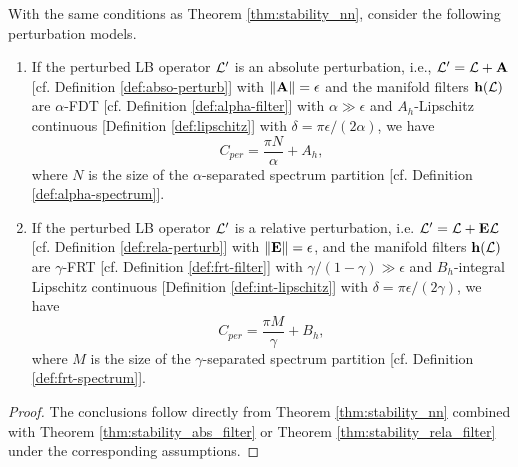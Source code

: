 \begin{proposition}
\label{prop:stability-nn}
With the same conditions as Theorem \ref{thm:stability_nn}, consider the following perturbation models.
\begin{enumerate}
    \item  If the perturbed LB operator ${\mathcal L}'$ is an absolute perturbation, i.e., ${\mathcal L}'={\mathcal L}+{\mathbf A}$ [cf. Definition \ref{def:abso-perturb}] with $\|{\mathbf A}\|=\epsilon$ and the manifold filters ${\mathbf h}({\mathcal L})$ are $\alpha$-FDT [cf. Definition \ref{def:alpha-filter}] with $\alpha\gg\epsilon$ and $A_h$-Lipschitz continuous [Definition \ref{def:lipschitz}] with $\delta = \pi\epsilon/(2\alpha)$, we have
    \begin{equation}
        C_{per} = \frac{\pi N}{\alpha} + A_h,
    \end{equation}
    where $N$ is the size of the $\alpha$-separated spectrum partition [cf. Definition \ref{def:alpha-spectrum}].
    \item If the perturbed LB operator ${\mathcal L}'$ is a relative perturbation, i.e. ${\mathcal L}'={\mathcal L}+{\mathbf E}{\mathcal L}$ [cf. Definition \ref{def:rela-perturb}] with $\|{\mathbf E}\|=\epsilon$, and the manifold filters ${\mathbf h}({\mathcal L})$ are $\gamma$-FRT [cf. Definition \ref{def:frt-filter}] with $\gamma/(1-\gamma)\gg\epsilon$ and $B_h$-integral Lipschitz continuous [Definition \ref{def:int-lipschitz}] with $\delta = \pi\epsilon/(2\gamma)$, we have
    \begin{equation}
        C_{per} = \frac{\pi M}{\gamma} + B_h,
    \end{equation}
    where $M$ is the size of the $\gamma$-separated spectrum partition [cf. Definition \ref{def:frt-spectrum}].
\end{enumerate}

\end{proposition}
\begin{proof}
The conclusions follow directly from Theorem \ref{thm:stability_nn} combined with Theorem \ref{thm:stability_abs_filter} or Theorem \ref{thm:stability_rela_filter} under the corresponding assumptions.
\end{proof}

